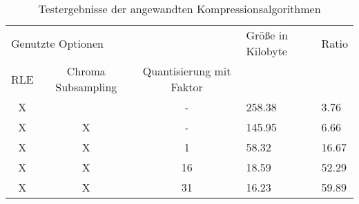 \begin{table}
\centering
\caption{Testergebnisse der angewandten Kompressionsalgorithmen}
\label{tab:test}
\begin{tabular}{cccll}
\multicolumn{3}{l}{Genutzte Optionen}               & Größe in Kilobyte & Ratio \\
RLE & Chroma Subsampling & Quantisierung mit Faktor &                   &       \\
X   &                    & -                        & 258.38            & 3.76  \\
X   & X                  & -                        & 145.95            & 6.66  \\
X   & X                  & 1                        & 58.32             & 16.67 \\
X   & X                  & 16                       & 18.59             & 52.29 \\
X   & X                  & 31                       & 16.23             & 59.89 \\
\end{tabular}
\end{table}
